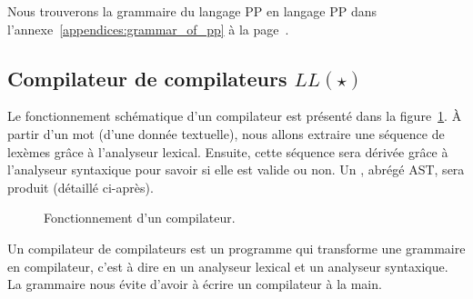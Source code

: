 Nous trouverons la grammaire du langage PP en langage PP dans
l'annexe~\ref{appendices:grammar_of_pp} à la
page~\pageref{appendices:grammar_of_pp}.

\subsection{Compilateur de compilateurs $LL(\star)$}
\label{subsection:data:compiler-compiler}

Le fonctionnement schématique d'un compilateur est présenté dans la
figure~\ref{figure:data:compiler}. À partir d'un {\strong mot} (d'une donnée
textuelle), nous allons extraire une {\strong séquence} de lexèmes grâce à
l'analyseur {\strong lexical}. Ensuite, cette séquence sera {\strong dérivée}
grâce à l'analyseur {\strong syntaxique} pour savoir si elle est valide ou non.
Un , abrégé AST, sera produit (détaillé
ci-après).
%
\begin{figure}


\caption{\label{figure:data:compiler} Fonctionnement d'un compilateur.}

\end{figure}
%
Un {\strong compilateur de compilateurs} est un programme qui transforme une
grammaire en compilateur, c'est à dire en un analyseur lexical et un analyseur
syntaxique. La grammaire nous évite d'avoir à écrire un compilateur à la main.

